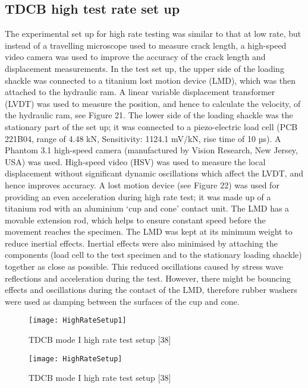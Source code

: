 \documentclass[numbers=noendperiod,chapterprefix=on]{icldt} %
\begin{document}
\subsection{TDCB high test rate set up}
The experimental set up for high rate testing was similar to that at low rate, but instead of a travelling microscope used to measure crack length, a high-speed video camera was used to improve the accuracy of the crack length and displacement measurements. 
In the test set up, the upper side of the loading shackle was connected to a titanium lost motion device (LMD), which was then attached to the hydraulic ram. A linear variable displacement transformer (LVDT) was used to measure the position, and hence to calculate the velocity, of the hydraulic ram, see Figure 21. 
The lower side of the loading shackle was the stationary part of the set up; it was connected to a piezo-electric load cell (PCB 221B04, range of 4.48 kN, Sensitivity: 1124.1 mV/kN, rise time of 10 µs). A Phantom 3.1 high-speed camera (manufactured by Vision Research, New Jersey, USA) was used. High-speed video (HSV) was used to measure the local displacement without significant dynamic oscillations which affect the LVDT, and hence improves accuracy.
A lost motion device (see Figure 22) was used for providing an even acceleration during high rate test; it was made up of a titanium rod with an aluminium ‘cup and cone’ contact unit. The LMD has a movable extension rod, which helps to ensure constant speed before the movement reaches the specimen. The LMD was kept at its minimum weight to reduce inertial effects. Inertial effects were also minimised by attaching the components (load cell to the test specimen and to the stationary loading shackle) together as close as possible. This reduced oscillations caused by stress wave reflections and acceleration during the test. However, there might be bouncing effects and oscillations during the contact of the LMD, therefore rubber washers were used as damping between the surfaces of the cup and cone.

\begin{figure}[!htpb]
\centering
\texttt{[image: HighRateSetup1]}
\caption{TDCB mode I high rate test setup [38]} %
\end{figure}

\begin{figure}[!htpb]
\centering
\texttt{[image: HighRateSetup]}
\caption{TDCB mode I high rate test setup [38]} %
\end{figure}
\end{document}
